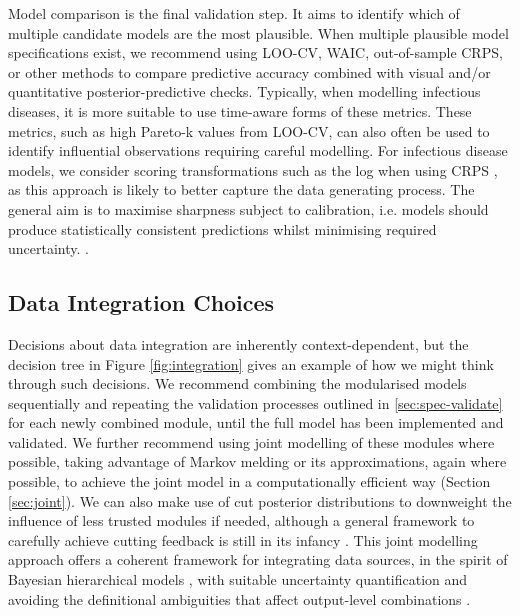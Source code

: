 \documentclass{article}
\begin{document}
Model comparison is the final validation step. It aims to identify which of multiple candidate models are the most plausible.
When multiple plausible model specifications exist, we recommend using \ac{LOO-CV}, \ac{WAIC}, out-of-sample \ac{CRPS}, or other methods to compare predictive accuracy \citep{yao2018using,gneiting2007strictly} combined with visual and/or quantitative posterior-predictive checks.
Typically, when modelling infectious diseases, it is more suitable to use time-aware forms of these metrics.
These metrics, such as high Pareto-k values from \ac{LOO-CV}, can also often be used to identify influential observations requiring careful modelling.
For infectious disease models, we consider scoring transformations such as the log when using \ac{CRPS} \citep{bosse2023scoring}, as this approach is likely to better capture the data generating process.
The general aim is to maximise sharpness subject to calibration, i.e. models should produce statistically consistent predictions whilst minimising required uncertainty. \citep{gneiting2007strictly}.

\subsection{Data Integration Choices}\label{sec:integration}

Decisions about data integration are inherently context-dependent, but the decision tree in Figure \ref{fig:integration} gives an example of how we might think through such decisions. We recommend combining the modularised models sequentially and repeating the validation processes outlined in \ref{sec:spec-validate} for each newly combined module, until the full model has been implemented and validated.
We further recommend using joint modelling of these modules where possible, taking advantage of Markov melding \citep{goudie2019joining} or its approximations, again where possible, to achieve the joint model in a computationally efficient way (Section \ref{sec:joint}). We can also make use of cut posterior distributions \citep{plummer2015cuts} to downweight the influence of less trusted modules if needed, although a general framework to carefully achieve cutting feedback is still in its infancy \citep{liu2025general}. 
This joint modelling approach offers a coherent framework for integrating data sources, in the spirit of Bayesian hierarchical models \citep{gelman2020bayesian,deangelis2018analysing}, with suitable uncertainty quantification and avoiding the definitional ambiguities that affect output-level combinations \citep{manley2024combining, brockhaus2023why}. 
\end{document}
